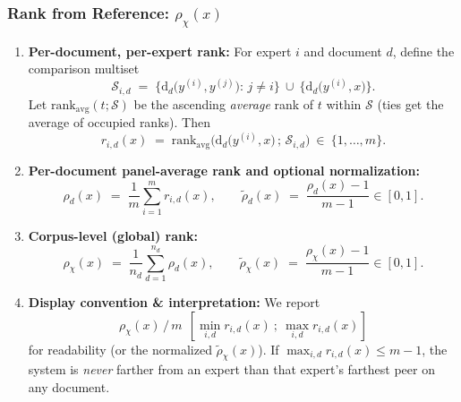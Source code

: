\documentclass[12pt]{article}
\begin{document}
\subsubsection{Rank from Reference: $\rho_{\chi}(x)$}
\begin{enumerate}
\item \textbf{Per-document, per-expert rank:}
For expert $i$ and document $d$, define the comparison multiset
\[
\mathcal{S}_{i,d}\;=\;\big\{\mathrm{d}_d\!\big(y^{(i)},y^{(j)}\big):\, j\neq i\big\}\ \cup\ \big\{\mathrm{d}_d\!\big(y^{(i)},x\big)\big\}.
\]
Let $\mathrm{rank}_{\mathrm{avg}}(t;\mathcal{S})$ be the ascending \emph{average} rank of $t$ within $\mathcal{S}$ (ties get the average of occupied ranks).
Then
\begin{equation}
r_{i,d}(x)\;=\;\mathrm{rank}_{\mathrm{avg}}\!\Big(\mathrm{d}_d\!\big(y^{(i)},x\big)\,;\,\mathcal{S}_{i,d}\Big)\ \in\ \{1,\dots,m\}.
\label{eq:per-doc-per-exp-rank-fused}
\end{equation}

\item \textbf{Per-document panel-average rank and optional normalization:}
\begin{equation}
\rho_d(x)\;=\;\frac{1}{m}\sum_{i=1}^{m} r_{i,d}(x),
\qquad
\tilde{\rho}_d(x)\;=\;\frac{\rho_d(x)-1}{m-1}\in[0,1].
\label{eq:per-doc-rho-fused}
\end{equation}

\item \textbf{Corpus-level (global) rank:}
\begin{equation}
\rho_{\chi}(x)\;=\;\frac{1}{n_d}\sum_{d=1}^{n_d}\rho_d(x),
\qquad
\tilde{\rho}_{\chi}(x)\;=\;\frac{\rho_{\chi}(x)-1}{m-1}\in[0,1].
\label{eq:global-rho-fused}
\end{equation}

\item \textbf{Display convention \& interpretation:}
We report
\[
\rho_{\chi}(x)\,/\,m\ \ [\min_{i,d} r_{i,d}(x)\ ;\ \max_{i,d} r_{i,d}(x)]
\]
for readability (or the normalized $\tilde{\rho}_{\chi}(x)$). If $\max_{i,d} r_{i,d}(x)\le m-1$, the system is \emph{never} farther from an expert than that expert's farthest peer on any document.
\end{enumerate}
\end{document}
